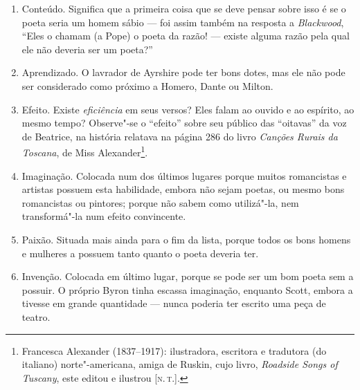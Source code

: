 \begin{enumerate}[label=(\scshape\alph*)]
\item Conteúdo. Significa que a primeira coisa que se deve pensar sobre
isso é se o poeta seria um homem sábio --- foi assim também na resposta a
\emph{Blackwood}, ``Eles o chamam (a Pope) o poeta da razão! --- existe
alguma razão pela qual ele não deveria ser um poeta?''

\item Aprendizado. O lavrador de Ayrshire pode ter bons dotes, mas ele
não pode ser considerado como próximo a Homero, Dante ou Milton.

\item Efeito. Existe \emph{eficiência} em seus versos? Eles falam ao
ouvido e ao espírito, ao mesmo tempo? Observe"-se o ``efeito'' sobre seu
público das ``oitavas'' da voz de Beatrice, na história relatava na
página 286 do livro \emph{Canções Rurais da Toscana}, de Miss
Alexander\footnote{Francesca Alexander (1837--1917): ilustradora,
  escritora e tradutora (do italiano) norte"-americana, amiga de Ruskin,
  cujo livro, \emph{Roadside Songs of Tuscany}, este editou e ilustrou
  {[}\textsc{n.\,t.}{]}.}.

\item Imaginação. Colocada num dos últimos lugares porque muitos
romancistas e artistas possuem esta habilidade, embora não sejam poetas,
ou mesmo bons romancistas ou pintores; porque não sabem como utilizá"-la,
nem transformá"-la num efeito convincente.

\item Paixão. Situada mais ainda para o fim da lista, porque todos os
bons homens e mulheres a possuem tanto quanto o poeta deveria ter.

\item Invenção. Colocada em último lugar, porque se pode ser um bom poeta
sem a possuir. O próprio Byron tinha escassa imaginação, enquanto Scott,
embora a tivesse em grande quantidade --- nunca poderia ter escrito uma
peça de teatro.
\end{enumerate}

